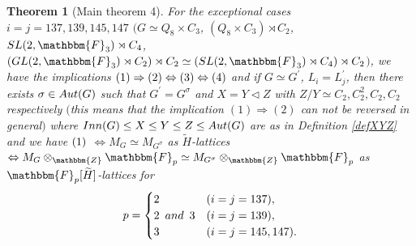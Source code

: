 \documentclass[10pt,a4paper]{amsart}
\newtheorem{theorem}{Theorem}
\newcommand{\GL}{{\rm GL}}\newcommand{\SL}{{\rm SL}}
\newcommand{\bF}{\mathbbm{F}}\newcommand{\bP}{\mathbbm{P}}
\newcommand{\bZ}{\mathbbm{Z}}\newcommand{\bQ}{\mathbbm{Q}}
\begin{document}
\begin{theorem}[Main theorem 4]
For the exceptional cases $i=j=137,139,145,147$ 
$($$G\simeq Q_8\times C_3$, $(Q_8\times C_3)\rtimes C_2$, 
$\SL(2,\bF_3)\rtimes C_4$, $(\GL(2,\bF_3)\rtimes C_2)\rtimes C_2\simeq 
(\SL(2,\bF_3)\rtimes C_4)\rtimes C_2$$)$, 
we have the implications 
${\rm (1)}\Rightarrow {\rm (2)}\Leftrightarrow {\rm (3)}
\Leftrightarrow {\rm (4)}$ and if $G\simeq G^\prime$, $L_i=L_j^\prime$, then 
there exists $\sigma\in {\rm Aut}(G)$ such that $G^\prime=G^\sigma$ 
and $X=Y\lhd Z$ with $Z/Y\simeq C_2,C_2^2,C_2,C_2$ respectively 
$($this means that the implication $(1)\Rightarrow (2)$ 
can not be reversed in general$)$
where ${\rm Inn}(G)\leq X\leq Y\leq Z\leq {\rm Aut}(G)$ 
are as in Definition \ref{defXYZ} 
%
and we have 
${\rm (1)}$ 
$\Leftrightarrow M_G\simeq M_{G^\sigma}$ as $\widetilde{H}$-lattices 
$\Leftrightarrow M_G\otimes_\bZ \bF_p\simeq M_{G^\sigma}\otimes_\bZ \bF_p$ 
as $\bF_p[\widetilde{H}]$-lattices for
\begin{align*}
p= 
\begin{cases}
2&(i=j=137),\\
2\ \,{\rm and}\ \,3&(i=j=139),\\
3&(i=j=145,147).
\end{cases}
\end{align*}


\end{theorem}
\end{document}
